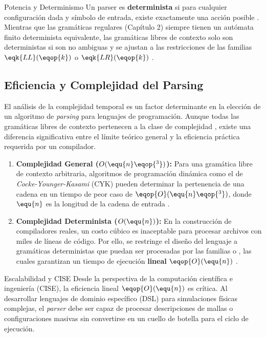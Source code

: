 \begin{observacion}{Potencia y Determinismo}
Un parser es \textbf{determinista} si para cualquier configuración dada y símbolo de entrada, existe exactamente una acción posible \cite{sipser2012introduction}. Mientras que las gramáticas regulares (Capítulo 2) siempre tienen un autómata finito determinista equivalente, las gramáticas libres de contexto solo son deterministas si son no ambiguas y se ajustan a las restricciones de las familias $\eqk{LL}(\eqop{k})$ o $\eqk{LR}(\eqop{k})$ \cite{aho2006compilers}.
\end{observacion}

\subsection{Eficiencia y Complejidad del Parsing}
\label{subsec:3_4_4_eficiencia}

El análisis de la complejidad temporal es un factor determinante en la elección de un algoritmo de \textit{parsing} para lenguajes de programación. Aunque todas las gramáticas libres de contexto pertenecen a la clase de complejidad  \cite{sipser2012introduction}, existe una diferencia significativa entre el límite teórico general y la eficiencia práctica requerida por un compilador.

\begin{enumerate}
    \item \textbf{Complejidad General ($O(\equ{n}\eqop{^3})$):} Para una gramática libre de contexto arbitraria, algoritmos de programación dinámica como el de \textit{Cocke-Younger-Kasami} (CYK) pueden determinar la pertenencia de una cadena en un tiempo de peor caso de $\eqop{O}(\equ{n}\eqop{^3})$, donde $\equ{n}$ es la longitud de la cadena de entrada \cite{sipser2012introduction}.
    \item \textbf{Complejidad Determinista ($O(\equ{n})$):} En la construcción de compiladores reales, un costo cúbico es inaceptable para procesar archivos con miles de líneas de código. Por ello, se restringe el diseño del lenguaje a gramáticas deterministas que puedan ser procesadas por las familias  o , las cuales garantizan un tiempo de ejecución \textbf{lineal} $\eqop{O}(\equ{n})$ \cite{aho2006compilers}.
\end{enumerate}

\begin{observacion}{Escalabilidad y CISE}
Desde la perspectiva de la computación científica e ingeniería (CISE), la eficiencia lineal $\eqop{O}(\equ{n})$ es crítica. Al desarrollar lenguajes de dominio específico (DSL) para simulaciones físicas complejas, el \textit{parser} debe ser capaz de procesar descripciones de mallas o configuraciones masivas sin convertirse en un cuello de botella para el ciclo de ejecución.
\end{observacion}

